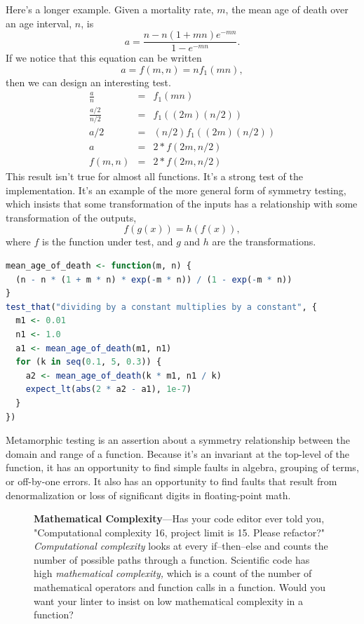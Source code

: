 \documentclass[fleqn,10pt]{olplainarticle}
\newenvironment{callout}
{
\begin{figure}
\begin{center}
\begin{minipage}{0.9\textwidth}
\begin{framed}
}
{
\end{framed}
\end{minipage}
\end{center}
\end{figure}
}
\begin{document}
Here's a longer example. Given a mortality rate, $m$, the
mean age of death over an age interval, $n$, is
\begin{equation}
    a = \frac{n - n(1+m n)e^{-m n}}{1 - e^{-m n}}.
\end{equation}
If we notice that this equation can be written
\begin{equation}
    a = f(m, n) = n  f_1(m  n),
\end{equation}
then we can design an interesting test.
\begin{eqnarray}
    \frac{a}{n} &= &f_1(m  n) \\
    \frac{a/2}{n/2} &= & f_1((2  m)  (n / 2)) \\
    a /2 &= & (n/2) f_1((2  m)  (n / 2)) \\
    a &= &2 * f(2m, n/2) \\
    f(m, n) & =& 2 * f(2m, n/2)
\end{eqnarray}
This result isn't true for almost all functions. It's a strong test
of the implementation. It's an example of the more general
form of symmetry testing, which insists that some transformation
of the inputs has a relationship with some transformation of the 
outputs,
\begin{equation}
    f(g(x)) = h(f(x)),
\end{equation}
where $f$ is the function under test, and $g$ and $h$ are the transformations.

\begin{lstlisting}[language=R]
mean_age_of_death <- function(m, n) {
  (n - n * (1 + m * n) * exp(-m * n)) / (1 - exp(-m * n))
}
test_that("dividing by a constant multiplies by a constant", {
  m1 <- 0.01
  n1 <- 1.0
  a1 <- mean_age_of_death(m1, n1)
  for (k in seq(0.1, 5, 0.3)) {
    a2 <- mean_age_of_death(k * m1, n1 / k)
    expect_lt(abs(2 * a2 - a1), 1e-7)
  }
})
\end{lstlisting}

Metamorphic testing is an assertion about a symmetry relationship between
the domain and range of a function. Because it's an invariant at the top-level
of the function, it has an opportunity to find simple faults in algebra,
grouping of terms, or off-by-one errors. It also has an opportunity to
find faults that result from denormalization or loss of significant digits
in floating-point math.


\begin{callout}
\textbf{Mathematical Complexity}---Has your code editor ever told you,
"Computational complexity 16, project limit is 15. Please refactor?"
\emph{Computational complexity} looks at every if--then--else and counts the
number of possible paths through a function.
Scientific code has high \emph{mathematical complexity,\/} which is a
count of the number of mathematical operators and function calls in
a function. Would you want your linter to insist on low mathematical complexity in
a function?
\end{callout}
\end{document}

